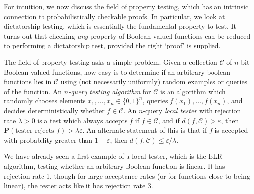 For intuition, we now discuss the field of property testing, which has an intrinsic connection to probabilistically checkable proofs. In particular, we look at dictatorship testing, which is essentially the fundamental property to test. It turns out that checking {\it any} property of Boolean-valued functions can be reduced to performing a dictatorship test, provided the right `proof' is supplied.

The field of property testing asks a simple problem. Given a collection $\mathcal{C}$ of $n$-bit Boolean-valued functions, how easy is to determine if an arbitrary boolean functions lies in $\mathcal{C}$ using (not necessarily uniformly) random examples or queries of the function. An \emph{$n$-query testing algorithm} for $\mathcal{C}$ is an algorithm which randomly chooses elements $x_1, \dots, x_n \in \{ 0, 1 \}^n$, queries $f(x_1), \dots, f(x_n)$, and decides deterministically whether $f \in \mathcal{C}$. An $n$-query \emph{local tester} with rejection rate $\lambda > 0$ is a test which always accepts $f$ if $f \in \mathcal{C}$, and if $d(f,\mathcal{C}) > \varepsilon$, then $\mathbf{P}(\text{tester rejects $f$}) > \lambda \varepsilon$. An alternate statement of this is that if $f$ is accepted with probability greater than $1 - \varepsilon$, then $d(f,\mathcal{C}) \leq \varepsilon/\lambda$.

\begin{example}
    We have already seen a first example of a local tester, which is the BLR algorithm, testing whether an arbitrary Boolean function is linear. It has rejection rate 1, though for large acceptance rates (or for functions close to being linear), the tester acts like it has rejection rate $3$.
\end{example}

